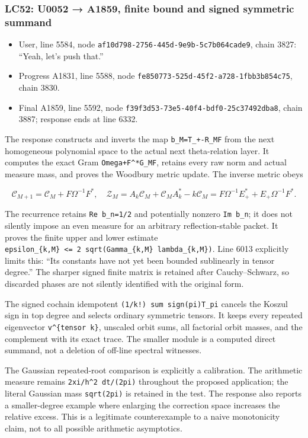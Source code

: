 \subsubsection{LC52: U0052 → A1859, finite bound and signed symmetric
summand}\label{lc52-u0052-a1859-finite-bound-and-signed-symmetric-summand}

\begin{itemize}
\tightlist
\item
  User, line 5584, node \texttt{af10d798-2756-445d-9e9b-5c7b064cade9},
  chain 3827: ``Yeah, let's push that.''
\item
  Progress A1831, line 5588, node
  \texttt{fe850773-525d-45f2-a728-1fbb3b854c75}, chain 3830.
\item
  Final A1859, line 5592, node
  \texttt{f39f3d53-73e5-40f4-bdf0-25c37492dba8}, chain 3887; response
  ends at line 6332.
\end{itemize}

The response constructs and inverts the map \texttt{b\_M=T\_+-R\_MF}
from the next homogeneous polynomial space to the actual next
theta-relation layer. It computes the exact Gram
\texttt{Omega+F\^{}*G\_MF}, retains every raw norm and actual measure
mass, and proves the Woodbury metric update. The inverse metric obeys

\[
\mathcal C_{M+1}=\mathcal C_M+F\Omega^{-1}F^*,\quad
\mathcal Z_M=A_k\mathcal C_M+\mathcal C_MA_k^*-k\mathcal C_M
=F\Omega^{-1}E_+^*+E_+\Omega^{-1}F^*.
\]

The recurrence retains \texttt{Re\ b\_n=1/2} and potentially nonzero
\texttt{Im\ b\_n}; it does not silently impose an even measure for an
arbitrary reflection-stable packet. It proves the finite upper and lower
estimate
\texttt{epsilon\_\{k,M\}\ \textless{}=\ 2\ sqrt(Gamma\_\{k,M\}\ lambda\_\{k,M\})}.
Line 6013 explicitly limits this: ``Its constants have not yet been
bounded sublinearly in tensor degree.'' The sharper signed finite matrix
is retained after Cauchy--Schwarz, so discarded phases are not silently
identified with the original form.

The signed cochain idempotent \texttt{(1/k!)\ sum\ sign(pi)T\_pi}
cancels the Koszul sign in top degree and selects ordinary symmetric
tensors. It keeps every repeated eigenvector
\texttt{v\^{}\{tensor\ k\}}, unscaled orbit sums, all factorial orbit
masses, and the complement with its exact trace. The smaller module is a
computed direct summand, not a deletion of off-line spectral witnesses.

The Gaussian repeated-root comparison is explicitly a calibration. The
arithmetic measure remains
\texttt{\textbar{}2xi/h\textbar{}\^{}2\ dt/(2pi)} throughout the
proposed application; the literal Gaussian mass \texttt{sqrt(2pi)} is
retained in the test. The response also reports a smaller-degree example
where enlarging the correction space increases the relative excess. This
is a legitimate counterexample to a naive monotonicity claim, not to all
possible arithmetic asymptotics.

